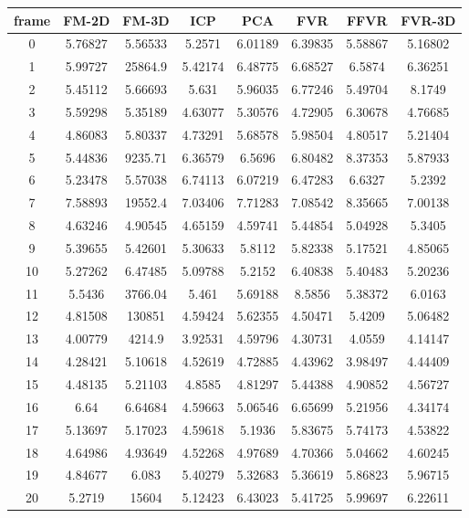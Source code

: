 \begin{figure}
\centering
\begin{tabular}{cccccccc}
\hline
\textbf{frame} & \textbf{FM-2D} & \textbf{FM-3D} & \textbf{ICP} & \textbf{PCA} & \textbf{FVR} & \textbf{FFVR} & \textbf{FVR-3D}
\\ \hline
0 & 5.76827 & 5.56533 & 5.2571 & 6.01189 & 6.39835 & 5.58867 & 5.16802\\
1 & 5.99727 & 25864.9 & 5.42174 & 6.48775 & 6.68527 & 6.5874 & 6.36251\\
2 & 5.45112 & 5.66693 & 5.631 & 5.96035 & 6.77246 & 5.49704 & 8.1749\\
3 & 5.59298 & 5.35189 & 4.63077 & 5.30576 & 4.72905 & 6.30678 & 4.76685\\
4 & 4.86083 & 5.80337 & 4.73291 & 5.68578 & 5.98504 & 4.80517 & 5.21404\\
5 & 5.44836 & 9235.71 & 6.36579 & 6.5696 & 6.80482 & 8.37353 & 5.87933\\
6 & 5.23478 & 5.57038 & 6.74113 & 6.07219 & 6.47283 & 6.6327 & 5.2392\\
7 & 7.58893 & 19552.4 & 7.03406 & 7.71283 & 7.08542 & 8.35665 & 7.00138\\
8 & 4.63246 & 4.90545 & 4.65159 & 4.59741 & 5.44854 & 5.04928 & 5.3405\\
9 & 5.39655 & 5.42601 & 5.30633 & 5.8112 & 5.82338 & 5.17521 & 4.85065\\
10 & 5.27262 & 6.47485 & 5.09788 & 5.2152 & 6.40838 & 5.40483 & 5.20236\\
11 & 5.5436 & 3766.04 & 5.461 & 5.69188 & 8.5856 & 5.38372 & 6.0163\\
12 & 4.81508 & 130851 & 4.59424 & 5.62355 & 4.50471 & 5.4209 & 5.06482\\
13 & 4.00779 & 4214.9 & 3.92531 & 4.59796 & 4.30731 & 4.0559 & 4.14147\\
14 & 4.28421 & 5.10618 & 4.52619 & 4.72885 & 4.43962 & 3.98497 & 4.44409\\
15 & 4.48135 & 5.21103 & 4.8585 & 4.81297 & 5.44388 & 4.90852 & 4.56727\\
16 & 6.64 & 6.64684 & 4.59663 & 5.06546 & 6.65699 & 5.21956 & 4.34174\\
17 & 5.13697 & 5.17023 & 4.59618 & 5.1936 & 5.83675 & 5.74173 & 4.53822\\
18 & 4.64986 & 4.93649 & 4.52268 & 4.97689 & 4.70366 & 5.04662 & 4.60245\\
19 & 4.84677 & 6.083 & 5.40279 & 5.32683 & 5.36619 & 5.86823 & 5.96715\\
20 & 5.2719 & 15604 & 5.12423 & 6.43023 & 5.41725 & 5.99697 & 6.22611\\

\end{tabular}
\end{figure}
